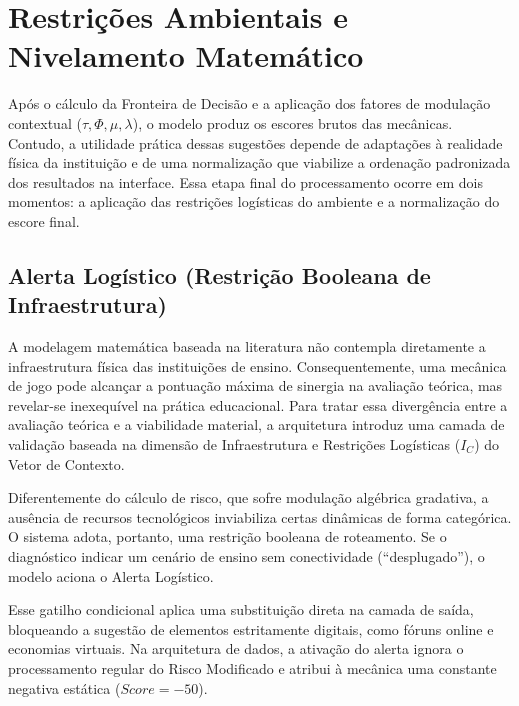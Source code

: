 

\section{Restrições Ambientais e Nivelamento Matemático}

Após o cálculo da Fronteira de Decisão e a aplicação dos fatores de modulação contextual ($\tau, \Phi, \mu, \lambda$), o modelo produz os escores brutos das mecânicas. Contudo, a utilidade prática dessas sugestões depende de adaptações à realidade física da instituição e de uma normalização que viabilize a ordenação padronizada dos resultados na interface. Essa etapa final do processamento ocorre em dois momentos: a aplicação das restrições logísticas do ambiente e a normalização do escore final.


\subsection{Alerta Logístico (Restrição Booleana de Infraestrutura)}

A modelagem matemática baseada na literatura não contempla diretamente a infraestrutura física das instituições de ensino. Consequentemente, uma mecânica de jogo pode alcançar a pontuação máxima de sinergia na avaliação teórica, mas revelar-se inexequível na prática educacional. Para tratar essa divergência entre a avaliação teórica e a viabilidade material, a arquitetura introduz uma camada de validação baseada na dimensão de Infraestrutura e Restrições Logísticas ($I_C$) do Vetor de Contexto.

Diferentemente do cálculo de risco, que sofre modulação algébrica gradativa, a ausência de recursos tecnológicos inviabiliza certas dinâmicas de forma categórica. O sistema adota, portanto, uma restrição booleana de roteamento. Se o diagnóstico indicar um cenário de ensino sem conectividade (``desplugado''), o modelo aciona o Alerta Logístico.

Esse gatilho condicional aplica uma substituição direta na camada de saída, bloqueando a sugestão de elementos estritamente digitais, como fóruns online e economias virtuais. Na arquitetura de dados, a ativação do alerta ignora o processamento regular do Risco Modificado e atribui à mecânica uma constante negativa estática ($Score = -50$).

